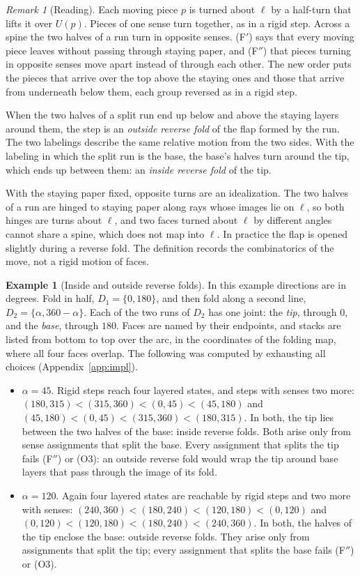 \documentclass[11pt]{amsart}
\theoremstyle{definition}
\newtheorem{example}[theorem]{Example}
\theoremstyle{remark}
\newtheorem{remark}[theorem]{Remark}
\begin{document}
\begin{remark}[Reading]\label{rem:reverse}
Each moving piece $p$ is turned about $\ell$ by a half-turn that lifts it over $U(p)$. Pieces of
one sense turn together, as in a rigid step. Across a spine the two halves of a run turn in opposite
senses. (F$'$) says that every moving piece leaves without passing through staying paper, and
(F$''$) that pieces turning in opposite senses move apart instead of through each other. The new
order puts the pieces that arrive over the top above the staying ones and those that arrive from
underneath below them, each group reversed as in a rigid step.

When the two halves of a split run end up below and above the staying layers around them, the
step is an \emph{outside reverse fold} of the flap formed by the run. The two labelings describe the
same relative motion from the two sides. With the labeling in which the split run is the base, the
base's halves turn around the tip, which ends up between them: an \emph{inside reverse fold} of the
tip.

With the staying paper fixed, opposite turns are an idealization. The two halves of a run are
hinged to staying paper along rays whose images lie on $\ell$, so both hinges are turns about $\ell$,
and two faces turned about $\ell$ by different angles cannot share a spine, which does not map into
$\ell$. In practice the flap is opened slightly during a reverse fold. The definition records the
combinatorics of the move, not a rigid motion of faces.
\end{remark}

\begin{example}[Inside and outside reverse folds]\label{ex:reverse}
In this example directions are in degrees. Fold in half, $D_1=\{0,180\}$, and then fold along a
second line, $D_2=\{\alpha,360-\alpha\}$. Each of the two runs of $D_2$ has one joint: the
\emph{tip}, through $0$, and the \emph{base}, through $180$. Faces are named by their endpoints, and
stacks are listed from bottom to top over the arc, in the coordinates of the folding map, where all
four faces overlap. The following was computed by exhausting all choices (Appendix~\ref{app:impl}).
\begin{itemize}[leftmargin=*]
\item $\alpha=45$. Rigid steps reach four layered states, and steps with senses two more:
$(180,315)<(315,360)<(0,45)<(45,180)$ and $(45,180)<(0,45)<(315,360)<(180,315)$. In both, the tip
lies between the two halves of the base: inside reverse folds. Both arise only from sense
assignments that split the base. Every assignment that splits the tip fails (F$''$) or (O3):
an outside reverse fold would wrap the tip around base layers that pass through the image of its fold.
\item $\alpha=120$. Again four layered states are reachable by rigid steps and two more with senses:
$(240,360)<(180,240)<(120,180)<(0,120)$ and $(0,120)<(120,180)<(180,240)<(240,360)$. In both, the
halves of the tip enclose the base: outside reverse folds. They arise only from assignments that
split the tip; every assignment that splits the base fails (F$''$) or (O3).
\end{itemize}
\end{example}
\end{document}
